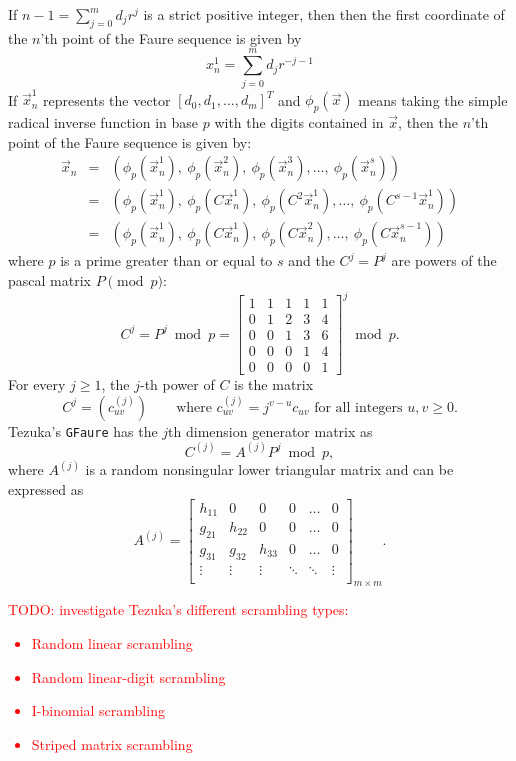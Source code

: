 If $n-1 = \sum_{j=0}^{m}d_jr^j$ is a strict positive integer, then then
the first coordinate of the $n$'th point of the Faure sequence is given by
\cite{faure82}
\[
x_n^1 = \sum_{j=0}^{m}d_jr^{-j-1}
\]
If $\vec{x}_n^1$ represents the vector $[d_0, d_1, \dots, d_m]^T$ and
$\phi_p(\vec{x})$ means taking the simple radical inverse function in base
$p$ with the
digits contained in $\vec{x}$, then the $n$'th point of the Faure sequence is
given by:
\begin{eqnarray*}
\vec{x}_n & = & (\phi_p(\vec{x}_n^1),\ \phi_p(\vec{x}_n^2),\ \phi_p(\vec{x}_n^3), \dots,\ \phi_p(\vec{x}_n^s)) \\
          & = & (\phi_p(\vec{x}_n^1),\ \phi_p(C\vec{x}_n^1),\ \phi_p(C^2\vec{x}_n^1), \dots,\ \phi_p(C^{s-1}\vec{x}_n^1)) \\
          & = & (\phi_p(\vec{x}_n^1),\ \phi_p(C\vec{x}_n^1),\ \phi_p(C\vec{x}_n^2), \dots,\ \phi_p(C\vec{x}_n^{s-1}))
\end{eqnarray*}
where $p$ is a prime greater than or equal to $s$ and the $C^j=P^j$ are
powers of the pascal matrix $P \pmod{p}$:
\[
C^j = 
P^j \bmod{p} =
\begin{bmatrix}
1 & 1 & 1 & 1 & 1 \\
0 & 1 & 2 & 3 & 4 \\
0 & 0 & 1 & 3 & 6 \\
0 & 0 & 0 & 1 & 4 \\
0 & 0 & 0 & 0 & 1
\end{bmatrix}^j \bmod{p}.
\]
For every $j \geq 1$, the $j$-th power of $C$ is the matrix
\[
C^j = (c_{uv}^{(j)})
\qquad \text{where $c_{uv}^{(j)}=j^{v-u}c_{uv}$ for all integers $u, v \geq 0$.}
\]
%
Tezuka's \verb!GFaure! \cite{tezuka95} has the $j$th dimension generator matrix as
\[
C^{(j)} = A^{(j)}P^j \bmod{p},
\]
where $A^{(j)}$ is a random nonsingular lower triangular matrix and can be
expressed as
\[
A^{(j)} =
\begin{bmatrix}
h_{11} & 0      & 0      & 0      & \ldots & 0 \\
g_{21} & h_{22} & 0      & 0      & \ldots & 0 \\
g_{31} & g_{32} & h_{33} & 0      & \ldots & 0 \\
\vdots & \vdots & \vdots & \ddots & \ddots & \vdots \\
\end{bmatrix}_{m \times m}.
\]
%
\textcolor{red}{TODO: investigate Tezuka's different scrambling types:
\begin{itemize}
\item Random linear scrambling
\item Random linear-digit scrambling
\item I-binomial scrambling
\item Striped matrix scrambling
\end{itemize}}


